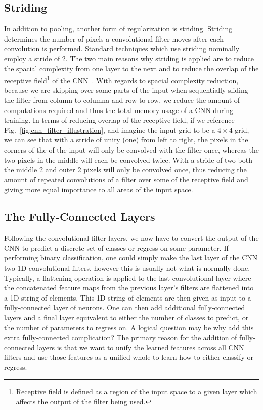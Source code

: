 \subsection{Striding}
In addition to pooling, another form of regularization is 
striding. Striding determines the number of pixels a 
convolutional filter moves after each convolution 
is performed. Standard techniques which use striding 
nominally employ 
a stride of 2. The two main reasons why striding is applied 
are to reduce the spacial complexity from one layer to the 
next and to reduce the overlap of the receptive field\footnote{
Receptive field is defined as a region of the input 
space to a given layer which affects the output of the 
filter being used.} 
of the \ac{CNN}~\cite{2017arXiv171202502K}. With regards to 
spacial complexity reduction, 
because we are skipping over some parts of the input when 
sequentially sliding the filter from column to columna and 
row to row, we reduce the amount of computations 
required and thus the total memory usage of a 
\ac{CNN} during training. In terms of reducing overlap 
of the receptive field, if we reference Fig.~\ref{fig:cnn_filter_illustration}, 
and imagine the input grid to be a $4\times4$ grid,
we can see that with a stride of unity (one) from left to right, 
the pixels in the corners of the of the input will only 
be convolved with the filter once, whereas the two pixels in the middle 
will each be convolved twice. With a stride of two both the middle 2 
and outer 2 pixels will only be convolved once, thus reducing 
the amount of repeated convolutions of a filter over some of 
the receptive field and giving more equal importance 
to all areas of the input space. 

\subsection{The Fully-Connected Layers}
Following the convolutional filter layers, we now 
have to convert the output of the CNN to predict 
a discrete set of classes or regress on some parameter. 
If performing binary classification, one could simply 
make the last layer of the \ac{CNN} two 1D convolutional 
filters, however this is usually not what is normally 
done. Typically, a flattening operation is applied 
to the last convolutional layer where the concatenated 
feature maps from the previous layer's filters 
are flattened into a 1D string of elements. This 1D 
string of elements are then given as input to 
a fully-connected layer of neurons. One can then add 
additional fully-connected layers and a final 
layer equivalent to either the number of classes to 
predict, or the number of parameters to regress on. 
A logical question may be why add this extra 
fully-connected complication? The primary reason 
for the addition of fully-connected layers is that we want 
to unify the learned features across all 
\ac{CNN} filters and use those features as a unified 
whole to learn how to either classify or regress.


